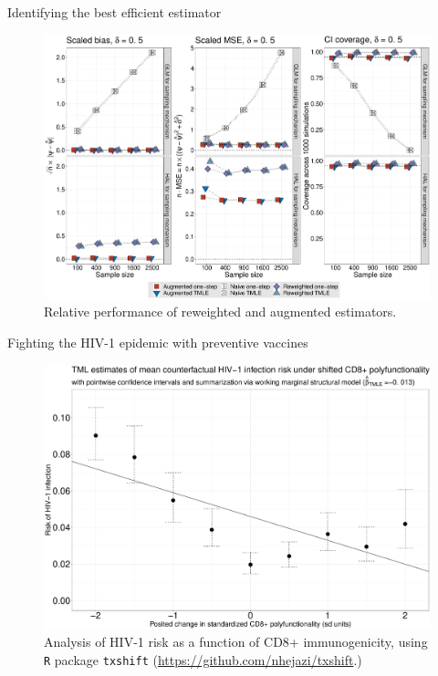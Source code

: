 \documentclass{beamer}
\begin{document}

\begin{frame}[c]{Identifying the best efficient estimator}

\begin{figure}[H]
  \centering
  \includegraphics[scale=0.22]{simple_effect_panel_delta_upshift}
  \caption{
    Relative performance of reweighted and augmented estimators.
  }
\end{figure}

\note{
}

\end{frame}


\begin{frame}[c]{Fighting the HIV-1 epidemic with preventive vaccines}

\begin{figure}[H]
  \centering
  \includegraphics[scale=0.19]{cd8_msm_tmle_summary}
  \caption{
    Analysis of HIV-1 risk as a function of CD8+ immunogenicity, using
    \texttt{R} package \texttt{txshift}
    (\url{https://github.com/nhejazi/txshift}.)
  }
\end{figure}

\note{
}

\end{frame}
\end{document}
